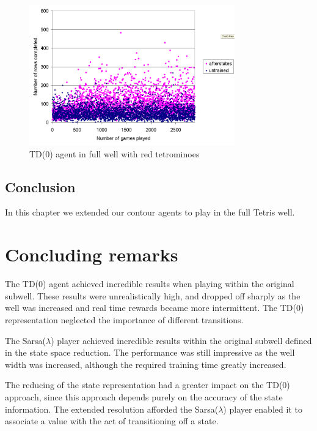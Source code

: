 \documentclass{rucsthesis}
\begin{document}
\begin{figure}[h]
\centering
\includegraphics[width=3.5in]{afterstatesheightredtetfullwell.png}
\caption{TD(0) agent in full well with red tetrominoes}
\label{fig:afterstatesheightredtetfullwell}
\end{figure}

\section{Conclusion}

In this chapter we extended our contour agents to play in the full Tetris well.

\chapter{Concluding remarks}

The TD(0) agent achieved incredible results when playing within the original subwell. These results were unrealistically high, and dropped off sharply as the well was increased and real time rewards became more intermittent. The TD(0) representation neglected the importance of different transitions.

The Sarsa($\lambda$) player achieved incredible results within the original subwell defined in the state space reduction. The performance was still impressive as the well width was increased, although the required training time greatly increased.

The reducing of the state representation had a greater impact on the TD(0) approach, since this approach depends purely on the accuracy of the state information. The extended resolution afforded the Sarsa($\lambda$) player enabled it to associate a value with the act of transitioning off a state. 


\end{document}

